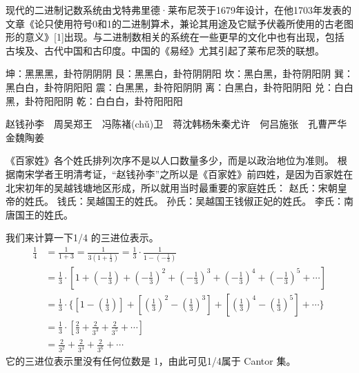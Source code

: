 \documentclass[main.tex]{subfiles}
\begin{document}
现代的二进制记数系统由戈特弗里德·莱布尼茨于1679年设计，在他1703年发表的文章《论只使用符号0和1的二进制算术，兼论其用途及它赋予伏羲所使用的古老图形的意义》[1]出现。与二进制数相关的系统在一些更早的文化中也有出现，包括古埃及、古代中国和古印度。中国的《易经》尤其引起了莱布尼茨的联想。

坤：黑黑黑，卦符阴阴阴
艮：黑黑白，卦符阴阴阳
坎：黑白黑，卦符阴阳阴
巽：黑白白，卦符阴阳阳
震：白黑黑，卦符阳阴阴
离：白黑白，卦符阳阴阳
兑：白白黑，卦符阳阳阴
乾：白白白，卦符阳阳阳

赵钱孙李　周吴郑王　冯陈褚(chǔ)卫　蒋沈韩杨朱秦尤许　何吕施张　孔曹严华　金魏陶姜

《百家姓》各个姓氏排列次序不是以人口数量多少，而是以政治地位为准则。
根据南宋学者王明清考证，“赵钱孙李”之所以是《百家姓》前四姓，是因为百家姓在北宋初年的吴越钱塘地区形成，所以就用当时最重要的家庭姓氏：
赵氏：宋朝皇帝的姓氏。
钱氏：吴越国王的姓氏。
孙氏：吴越国王钱俶正妃的姓氏。
李氏：南唐国王的姓氏。


我们来计算一下1/4 的三进位表示。
\begin{align*}
\frac{1}{4} &= \frac{1}{1+3} = \frac{1}{3(1+ \frac{1}{3})} 
  = \frac{1}{3} \cdot \frac{1}{1 - (- \frac{1}{3})} \\
  &	= \frac{1}{3} \cdot \left[ 
1 + \left(- \frac{1}{3}\right)
+  \left(- \frac{1}{3}\right)^2 + \left(- \frac{1}{3}\right)^3 
+ \left(- \frac{1}{3}\right)^4   +\left(- \frac{1}{3}\right)^5  +\cdots\right] \\
  &	= \frac{1}{3} \cdot\Big\{ \left[ 
1 - \left( \frac{1}{3}\right)\right]
+ \left[  \left(\frac{1}{3}\right)^2 - \left(\frac{1}{3}\right)^3 \right]
+ \left[ \left(\frac{1}{3}\right)^4   -\left(\frac{1}{3}\right)^5 \right] +\cdots\Big\}\\
  &	= \frac{1}{3} \cdot \left[ 
 \frac{2}{3}+ \frac{2}{3^3}+ \frac{2}{3^5}+\cdots\right] \\
&=  \frac{2}{3^2}+ \frac{2}{3^4}+ \frac{2}{3^6}+\cdots
\end{align*}
\noindent
它的三进位表示里没有任何位数是 1，由此可见1/4属于 Cantor 集。
\end{document}
